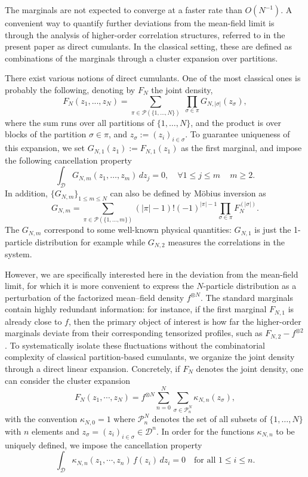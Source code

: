\documentclass[pdflatex,sn-mathphys-num]{sn-jnl}
\theoremstyle{thmstyleone}%
\theoremstyle{thmstyletwo}%
\theoremstyle{thmstylethree}%
\begin{document}
The marginals are not expected to converge at a faster rate than $O(N^{-1})$. A convenient way to quantify further deviations from the mean-field limit is through the analysis of higher-order correlation structures, referred to in the present paper as direct cumulants. In the classical setting, these are defined as combinations of the marginals through a cluster expansion over partitions. 

There exist various notions of direct cumulants. One of the most classical ones is probably the following,  denoting by $F_N$ the joint density, 
\[
F_{N}(z_1,...,z_N)
= \sum_{\pi \in \mathcal{P}(\{1,\dots,N\})} \;\prod_{\sigma \in \pi} G_{N,|\sigma|}(z_\sigma),
\]
where the sum runs over all partitions of $\{1,\dots,N\}$, and the product is over blocks of the partition $\sigma \in \pi$, and $z_\sigma := (z_i)_{i \in \sigma}$. To guarantee uniqueness of this expansion, we set $G_{N,1}(z_1) := F_{N,1}(z_1)$ as the first marginal, and impose the following cancellation property
\[\int_{\mathcal D} G_{N,m}(z_1,\dots,z_m)\,dz_j = 0 , \quad \forall 1 \leq j \leq m \,\,\, \ \ \ m \geq2.\]
In addition, $\{G_{N,m}\}_{1 \leq m \leq N}$ can also be defined by Möbius inversion as
\[
G_{N,m}
= \sum_{\pi \in \mathcal{P}(\{1,\dots,m\})}
(|\pi|-1)!(-1)^{|\pi|-1} \prod_{\sigma \in \pi} F_N^{(|\sigma|)}.
\]
The $G_{N,m}$ correspond to some well-known physical quantities: $G_{N,1}$ is just the 1-particle distribution for example while $G_{N,2}$ measures the correlations in the system.

However, we are specifically interested here in the deviation from the mean-field limit, for which it is more convenient to express the $N$-particle distribution as a perturbation of the factorized mean--field density $f^{\otimes N}$. 
The standard marginals contain highly redundant information: for instance, if the first marginal $F_{N,1}$ is already close to $f$, then the primary object of interest is how far the higher-order marginals deviate from their corresponding tensorized profiles, such as $F_{N,2} - f^{\otimes 2}$. 
To systematically isolate these fluctuations without the combinatorial complexity of classical partition-based cumulants, we organize the joint density through a direct linear expansion.
Concretely, if $F_N$ denotes the joint density, one can consider the cluster expansion
\[
F_N(z_1,\cdots,z_N)
= f^{\otimes N}\sum_{n=0}^N \sum_{\sigma \in \mathcal{P}_n^N} \kappa_{N,n}(z_\sigma),
\]
with the convention $\kappa_{N,0} = 1$ where $\mathcal{P}_n^N$ denotes the set of all subsets of $\{1,\dots,N\}$ with $n$ elements and $z_\sigma = (z_i)_{i\in \sigma}\in \mathcal{D}^n$.
\noindent
In order for the functions $\kappa_{N,n}$ to be  uniquely defined, we impose the cancellation property
\[
\int_{\mathcal{D}} \kappa_{N,n}(z_1,\cdots,z_n)\, f(z_i)\,dz_i = 0 \quad \text{for all } 1 \le i \le n.
\]
\end{document}
